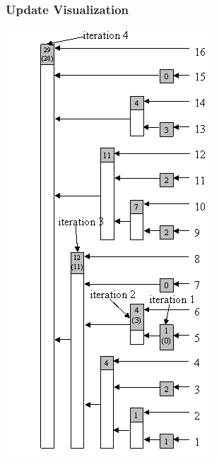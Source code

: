 \documentclass[12pt]{beamer}
\begin{document}
\begin{frame}
    \frametitle{Update Visualization}
    \begin{center}
        \includegraphics[width=\linewidth,height=.8\textheight,keepaspectratio]{img/update}
    \end{center}
\end{frame}
\end{document}
